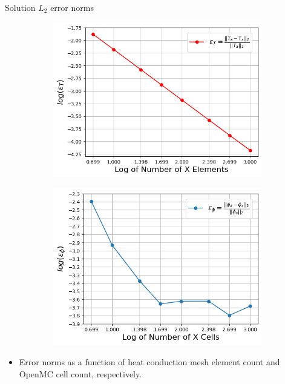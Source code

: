\documentclass[9pt,t]{beamer}
\begin{document}
\begin{frame}{Solution $L_{2}$ error norms}
    \begin{figure}[T]
        \centering
        \begin{subfigure}{0.475\linewidth}
            \includegraphics[height=0.8\linewidth]{figures/temp_error_norms.png}
        \end{subfigure}\hspace{0.35cm}
        \begin{subfigure}{0.475\linewidth}
            \includegraphics[height=0.8\linewidth]{figures/flux_error_norms.png}
        \end{subfigure}
    \end{figure}
    \begin{itemize}
        \item Error norms as a function of heat conduction mesh element count and OpenMC cell count, respectively.
    \end{itemize}
\end{frame}
\end{document}

